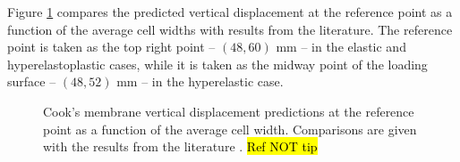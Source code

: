 \documentclass[sn-mathphys,Numbered]{sn-jnl}%
\begin{document}
Figure \ref{fig:cooksMembrane_disp} compares the predicted vertical displacement at the reference point as a function of the average cell widths with results from the literature.
The reference point is taken as the top right point -- $(48,60)$ mm -- in the elastic and hyperelastoplastic cases, while it is taken as the midway point of the loading surface -- $(48,52)$ mm -- in the hyperelastic case.
\begin{figure}[htbp]
   \centering
   \caption{Cook's membrane vertical displacement predictions at the reference point as a function of the average cell width. Comparisons are given with the results from the literature \cite{Zienkiewicz2000, Pelteret2018, Simo1992, Simplas}. \hl{Ref NOT tip}}
   \label{fig:cooksMembrane_disp}
\end{figure}
\end{document}
